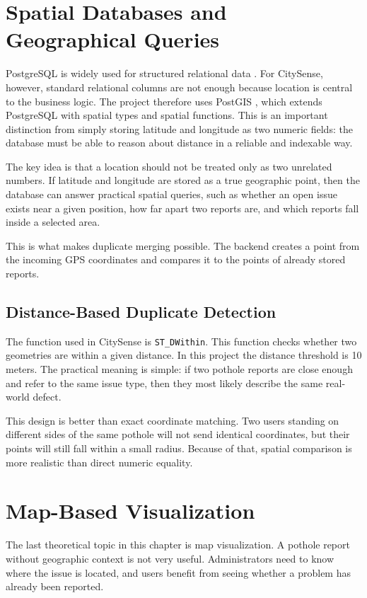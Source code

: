 \section{Spatial Databases and Geographical Queries}

PostgreSQL is widely used for structured relational data \cite{postgres_docs}. For CitySense, however, standard relational columns are not enough because location is central to the business logic. The project therefore uses PostGIS \cite{obe2021postgis}, which extends PostgreSQL with spatial types and spatial functions. This is an important distinction from simply storing latitude and longitude as two numeric fields: the database must be able to reason about distance in a reliable and indexable way.

The key idea is that a location should not be treated only as two unrelated numbers. If latitude and longitude are stored as a true geographic point, then the database can answer practical spatial queries, such as whether an open issue exists near a given position, how far apart two reports are, and which reports fall inside a selected area.

This is what makes duplicate merging possible. The backend creates a point from the incoming GPS coordinates and compares it to the points of already stored reports.

\subsection{Distance-Based Duplicate Detection}

The function used in CitySense is \texttt{ST\_DWithin}. This function checks whether two geometries are within a given distance. In this project the distance threshold is 10 meters. The practical meaning is simple: if two pothole reports are close enough and refer to the same issue type, then they most likely describe the same real-world defect.

This design is better than exact coordinate matching. Two users standing on different sides of the same pothole will not send identical coordinates, but their points will still fall within a small radius. Because of that, spatial comparison is more realistic than direct numeric equality.

\section{Map-Based Visualization}

The last theoretical topic in this chapter is map visualization. A pothole report without geographic context is not very useful. Administrators need to know where the issue is located, and users benefit from seeing whether a problem has already been reported.

